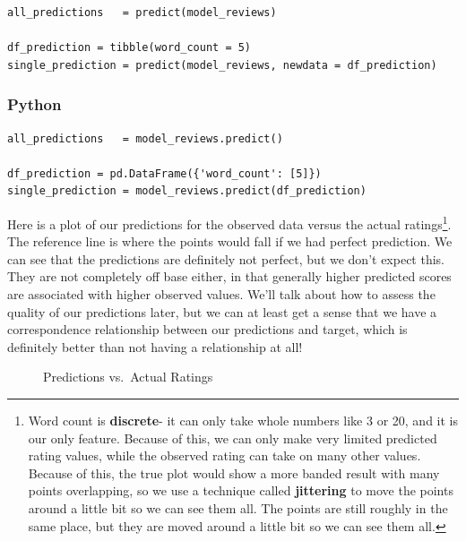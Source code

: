 \documentclass[
  letterpaper,
]{krantz}
\begin{document}
\begin{verbatim}
all_predictions   = predict(model_reviews)

df_prediction = tibble(word_count = 5)
single_prediction = predict(model_reviews, newdata = df_prediction)
\end{verbatim}

\subsubsection{Python}

\begin{verbatim}
all_predictions   = model_reviews.predict()

df_prediction = pd.DataFrame({'word_count': [5]})
single_prediction = model_reviews.predict(df_prediction)
\end{verbatim}

Here is a plot of our predictions for the observed data versus the
actual ratings\footnote{Word count is \textbf{discrete}- it can only
  take whole numbers like 3 or 20, and it is our only feature. Because
  of this, we can only make very limited predicted rating values, while
  the observed rating can take on many other values. Because of this,
  the true plot would show a more banded result with many points
  overlapping, so we use a technique called \textbf{jittering} to move
  the points around a little bit so we can see them all. The points are
  still roughly in the same place, but they are moved around a little
  bit so we can see them all.}. The reference line is where the points
would fall if we had perfect prediction. We can see that the predictions
are definitely not perfect, but we don't expect this. They are not
completely off base either, in that generally higher predicted scores
are associated with higher observed values. We'll talk about how to
assess the quality of our predictions later, but we can at least get a
sense that we have a correspondence relationship between our predictions
and target, which is definitely better than not having a relationship at
all!

\begin{figure}[H]


\caption{\label{fig-my-first-model-predictions-plot}Predictions
vs.~Actual Ratings}

\end{figure}%
\end{document}
